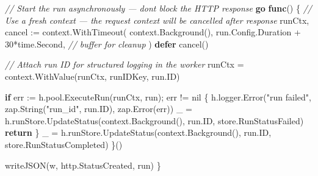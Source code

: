 \documentclass[
]{article}
\newenvironment{Shaded}{}{}
\newcommand{\CommentTok}[1]{\textcolor[rgb]{0.38,0.63,0.69}{\textit{#1}}}
\newcommand{\ControlFlowTok}[1]{\textcolor[rgb]{0.00,0.44,0.13}{\textbf{#1}}}
\newcommand{\DecValTok}[1]{\textcolor[rgb]{0.25,0.63,0.44}{#1}}
\newcommand{\KeywordTok}[1]{\textcolor[rgb]{0.00,0.44,0.13}{\textbf{#1}}}
\newcommand{\NormalTok}[1]{#1}
\newcommand{\OperatorTok}[1]{\textcolor[rgb]{0.40,0.40,0.40}{#1}}
\newcommand{\OtherTok}[1]{\textcolor[rgb]{0.00,0.44,0.13}{#1}}
\newcommand{\StringTok}[1]{\textcolor[rgb]{0.25,0.44,0.63}{#1}}
\begin{document}
\begin{Shaded}
\begin{Highlighting}[]
    \CommentTok{// Start the run asynchronously — don\textquotesingle{}t block the HTTP response}
    \ControlFlowTok{go} \KeywordTok{func}\OperatorTok{()} \OperatorTok{\{}
        \CommentTok{// Use a fresh context — the request context will be cancelled after response}
\NormalTok{        runCtx}\OperatorTok{,}\NormalTok{ cancel }\OperatorTok{:=}\NormalTok{ context}\OperatorTok{.}\NormalTok{WithTimeout}\OperatorTok{(}
\NormalTok{            context}\OperatorTok{.}\NormalTok{Background}\OperatorTok{(),}
\NormalTok{            run}\OperatorTok{.}\NormalTok{Config}\OperatorTok{.}\NormalTok{Duration }\OperatorTok{+} \DecValTok{30}\OperatorTok{*}\NormalTok{time}\OperatorTok{.}\NormalTok{Second}\OperatorTok{,} \CommentTok{// buffer for cleanup}
        \OperatorTok{)}
        \ControlFlowTok{defer}\NormalTok{ cancel}\OperatorTok{()}

        \CommentTok{// Attach run ID for structured logging in the worker}
\NormalTok{        runCtx }\OperatorTok{=}\NormalTok{ context}\OperatorTok{.}\NormalTok{WithValue}\OperatorTok{(}\NormalTok{runCtx}\OperatorTok{,}\NormalTok{ runIDKey}\OperatorTok{,}\NormalTok{ run}\OperatorTok{.}\NormalTok{ID}\OperatorTok{)}

        \ControlFlowTok{if}\NormalTok{ err }\OperatorTok{:=}\NormalTok{ h}\OperatorTok{.}\NormalTok{pool}\OperatorTok{.}\NormalTok{ExecuteRun}\OperatorTok{(}\NormalTok{runCtx}\OperatorTok{,}\NormalTok{ run}\OperatorTok{);}\NormalTok{ err }\OperatorTok{!=} \OtherTok{nil} \OperatorTok{\{}
\NormalTok{            h}\OperatorTok{.}\NormalTok{logger}\OperatorTok{.}\NormalTok{Error}\OperatorTok{(}\StringTok{"run failed"}\OperatorTok{,}\NormalTok{ zap}\OperatorTok{.}\NormalTok{String}\OperatorTok{(}\StringTok{"run\_id"}\OperatorTok{,}\NormalTok{ run}\OperatorTok{.}\NormalTok{ID}\OperatorTok{),}\NormalTok{ zap}\OperatorTok{.}\NormalTok{Error}\OperatorTok{(}\NormalTok{err}\OperatorTok{))}
\NormalTok{            \_ }\OperatorTok{=}\NormalTok{ h}\OperatorTok{.}\NormalTok{runStore}\OperatorTok{.}\NormalTok{UpdateStatus}\OperatorTok{(}\NormalTok{context}\OperatorTok{.}\NormalTok{Background}\OperatorTok{(),}\NormalTok{ run}\OperatorTok{.}\NormalTok{ID}\OperatorTok{,}\NormalTok{ store}\OperatorTok{.}\NormalTok{RunStatusFailed}\OperatorTok{)}
            \ControlFlowTok{return}
        \OperatorTok{\}}
\NormalTok{        \_ }\OperatorTok{=}\NormalTok{ h}\OperatorTok{.}\NormalTok{runStore}\OperatorTok{.}\NormalTok{UpdateStatus}\OperatorTok{(}\NormalTok{context}\OperatorTok{.}\NormalTok{Background}\OperatorTok{(),}\NormalTok{ run}\OperatorTok{.}\NormalTok{ID}\OperatorTok{,}\NormalTok{ store}\OperatorTok{.}\NormalTok{RunStatusCompleted}\OperatorTok{)}
    \OperatorTok{\}()}

\NormalTok{    writeJSON}\OperatorTok{(}\NormalTok{w}\OperatorTok{,}\NormalTok{ http}\OperatorTok{.}\NormalTok{StatusCreated}\OperatorTok{,}\NormalTok{ run}\OperatorTok{)}
\OperatorTok{\}}
\end{Highlighting}
\end{Shaded}
\end{document}
